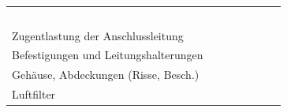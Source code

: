 \documentclass[11pt,a4paper,final,oneside,notitlepage]{report}
\begin{document}
\begin{tabularx}{\textwidth}{|p{}| p{}|p{}|p{}|}
		\raggedleft\arraybackslash\makebox[0pt][l]{$\square$}\raisebox{.15ex}{\hspace{0.1em}}\,\,\,\,\,\,\,  &
		\cellcolor{gray!10}\raggedleft\arraybackslash\makebox[0pt][l]{$\square$}\raisebox{.15ex}{\hspace{0.1em}}\,\,\,\,\,\,\, &
		\raggedleft\arraybackslash\makebox[0pt][l]{$\square$}\raisebox{.15ex}{\hspace{0.1em}}\,\,\,\,\,\,\, \\
		{\scriptsize Zugentlastung der Anschlussleitung } &
		\raggedleft\arraybackslash\makebox[0pt][l]{$\square$}\raisebox{.15ex}{\hspace{0.1em}}\,\,\,\,\,\,\, &
		\cellcolor{gray!10}\raggedleft\arraybackslash\makebox[0pt][l]{$\square$}\raisebox{.15ex}{\hspace{0.1em}}\,\,\,\,\,\,\, &
		\raggedleft\arraybackslash\makebox[0pt][l]{$\square$}\raisebox{.15ex}{\hspace{0.1em}}\,\,\,\,\,\,\,\\
		{\scriptsize Befestigungen und Leitungshalterungen } &
		\raggedleft\arraybackslash\makebox[0pt][l]{$\square$}\raisebox{.15ex}{\hspace{0.1em}}\,\,\,\,\,\,\, &
		\cellcolor{gray!10}\raggedleft\arraybackslash\makebox[0pt][l]{$\square$}\raisebox{.15ex}{\hspace{0.1em}}\,\,\,\,\,\,\, &
		\raggedleft\arraybackslash\makebox[0pt][l]{$\square$}\raisebox{.15ex}{\hspace{0.1em}}\,\,\,\,\,\,\,\\
		{\scriptsize Gehäuse, Abdeckungen (Risse, Besch.) } &
		\raggedleft\arraybackslash\makebox[0pt][l]{$\square$}\raisebox{.15ex}{\hspace{0.1em}}\,\,\,\,\,\,\, &
		\cellcolor{gray!10}\raggedleft\arraybackslash\makebox[0pt][l]{$\square$}\raisebox{.15ex}{\hspace{0.1em}}\,\,\,\,\,\,\, &
		\raggedleft\arraybackslash\makebox[0pt][l]{$\square$}\raisebox{.15ex}{\hspace{0.1em}}\,\,\,\,\,\,\,\\
		{\scriptsize Luftfilter } &
		\raggedleft\arraybackslash\makebox[0pt][l]{$\square$}\raisebox{.15ex}{\hspace{0.1em}}\,\,\,\,\,\,\, &
		\cellcolor{gray!10}\raggedleft\arraybackslash\makebox[0pt][l]{$\square$}\raisebox{.15ex}{\hspace{0.1em}}\,\,\,\,\,\,\, &
		\raggedleft\arraybackslash\makebox[0pt][l]{$\square$}\raisebox{.15ex}{\hspace{0.1em}}\,\,\,\,\,\,\,\\

\end{tabularx}
\end{document}
